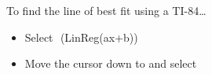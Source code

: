 \begin{center}
\begin{minipage}[t]{0.75\textwidth}
\begin{myConcept}{To find the line of best fit using a {\scshape TI-84}\dots}
\begin{enumerate}
\begin{itemize}
                    \item Select 
                    \fbox{\ttfamily >}
                        \,\,{(\small\ttfamily LinReg(ax+b))}
                    \item Move the cursor down to  
                        and select 
                \end{itemize}
        \end{enumerate}
    \end{myConcept}
    \end{minipage}
\end{center}
    
    